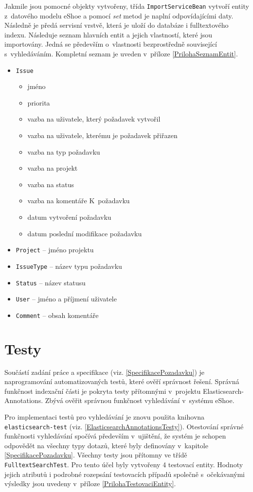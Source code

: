 \documentclass[11pt,oneside]{fithesis2}
\begin{document}
Jakmile jsou pomocné objekty vytvořeny, třída \texttt{ImportServiceBean} vytvoří entity z~datového modelu eShoe a pomocí \emph{set} metod je naplní odpovídajícími daty. Následně je předá servisní vrstvě, která je uloží do databáze i fulltextového indexu. 
Následuje seznam hlavních entit a jejich vlastností, které jsou importovány. Jedná se především o~vlastnosti bezprostředně související s~vyhledáváním. Kompletní seznam je uveden v~příloze \ref{PrilohaSeznamEntit}.
\begin{itemize}
	\item \texttt{Issue}
		\begin{itemize}
			\item jméno
			\item priorita
			\item vazba na uživatele, který požadavek vytvořil
			\item vazba na uživatele, kterému je požadavek přiřazen
			\item vazba na typ požadavku
			\item vazba na projekt			
			\item vazba na status
			\item vazba na komentáře K~požadavku
			\item datum vytvoření požadavku
			\item datum poslední modifikace požadavku
		\end{itemize}
	\item \texttt{Project} -- jméno projektu
	\item \texttt{IssueType} -- název typu požadavku
	\item \texttt{Status} -- název statusu
	\item \texttt{User} -- jméno a příjmení uživatele
	\item \texttt{Comment} -- obsah komentáře
\end{itemize}

\section{Testy}
Součástí zadání práce a specifikace (viz. \ref{SpecifikacePozadavku}) je naprogramování automatizovaných testů, které ověří správnost řešení. Správná funkčnost indexační části je pokryta testy přítomnými v~projektu Elasticsearch-Annotations. Zbývá ověřit správnou funkčnost vyhledávání v~systému eShoe.

Pro implementaci testů pro vyhledávání je znovu použita knihovna \texttt{elasticsearch-test} (viz. \ref{ElasticsearchAnnotationsTesty}). Otestování správné funkčnosti vyhledávání spočívá především v~ujištění, že systém je schopen odpovědět na všechny typy dotazů, které byly definovány v~kapitole \ref{SpecifikacePozadavku}. Všechny testy jsou přítomny ve třídě \texttt{FulltextSearchTest}. Pro tento účel byly vytvořeny 4 testovací entity. Hodnoty jejich atributů i podrobné rozepsání testovacích případů společně s~očekávanými výsledky jsou uvedeny v~příloze \ref{PrilohaTestovaciEntity}.
\end{document}
